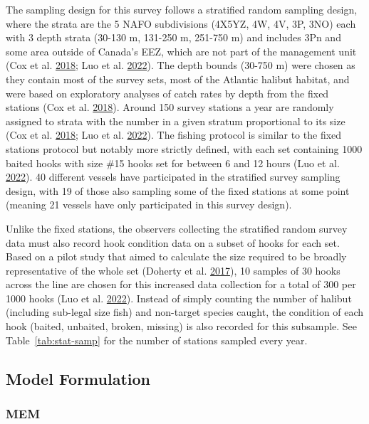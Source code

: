 \documentclass[12pt]{article}\usepackage[]{graphicx}\usepackage[]{color}
\begin{document}
The sampling design for this survey follows a stratified random sampling design, where the strata are the 5 NAFO subdivisions (4X5YZ, 4W, 4V, 3P, 3NO) each with 3 depth strata (30-130 m, 131-250 m, 251-750 m) and includes 3Pn and some area outside of Canada's EEZ, which are not part of the management unit (Cox et al. \protect\hyperlink{ref-Cox2018}{2018}; Luo et al. \protect\hyperlink{ref-Luo2022}{2022}). The depth bounds (30-750 m) were chosen as they contain most of the survey sets, most of the Atlantic halibut habitat, and were based on exploratory analyses of catch rates by depth from the fixed stations (Cox et al. \protect\hyperlink{ref-Cox2018}{2018}). Around 150 survey stations a year are randomly assigned to strata with the number in a given stratum proportional to its size (Cox et al. \protect\hyperlink{ref-Cox2018}{2018}; Luo et al. \protect\hyperlink{ref-Luo2022}{2022}). The fishing protocol is similar to the fixed stations protocol but notably more strictly defined, with each set containing 1000 baited hooks with size \#15 hooks set for between 6 and 12 hours (Luo et al. \protect\hyperlink{ref-Luo2022}{2022}). 40 different vessels have participated in the stratified survey sampling design, with 19 of those also sampling some of the fixed stations at some point (meaning 21 vessels have only participated in this survey design).

Unlike the fixed stations, the observers collecting the stratified random survey data must also record hook condition data on a subset of hooks for each set. Based on a pilot study that aimed to calculate the size required to be broadly representative of the whole set (Doherty et al. \protect\hyperlink{ref-Doherty2017}{2017}), 10 samples of 30 hooks across the line are chosen for this increased data collection for a total of 300 per 1000 hooks (Luo et al. \protect\hyperlink{ref-Luo2022}{2022}). Instead of simply counting the number of halibut (including sub-legal size fish) and non-target species caught, the condition of each hook (baited, unbaited, broken, missing) is also recorded for this subsample. See Table~\ref{tab:stat-samp} for the number of stations sampled every year.

\hypertarget{model-formulation}{%
\subsection{Model Formulation}\label{model-formulation}}

\hypertarget{mem}{%
\subsubsection{MEM}\label{mem}}
\end{document}
